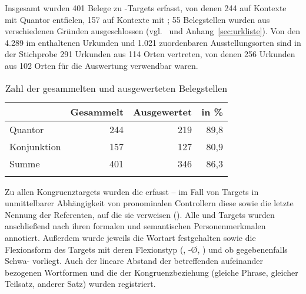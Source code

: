 \label{phsec:caohiatus}

Insgesamt wurden 401 Belege zu -Targets erfasst, von denen 244 auf
Kontexte mit Quantor entfielen, 157 auf Kontexte mit ; 55
Belegstellen wurden aus verschiedenen Gründen ausgeschlossen
(vgl.~ und Anhang~\ref{sec:urkliste}). Von den 4.289 im
\CAO{} enthaltenen Urkunden und 1.021 zuordenbaren Ausstellungsorten sind in
der Stichprobe 291 Urkunden aus 114 Orten vertreten, von denen 256 Urkunden aus
102 Orten für die Auswertung verwendbar waren.

\begin{table}
\centering
\caption{Zahl der gesammelten und ausgewerteten Belegstellen}
\begin{tabular}{l r r r}
\lsptoprule

%
	& Gesammelt
	& Ausgewertet
	& in \%
	\\

\midrule


Quantor
	& 244 %
	& 219 %
	& 89,8 %
	\\

Konjunktion
	& 157 %
	& 127 %
	& 80,9 %
	\\

\midrule

Summe
	& 401 %
	& 346 %
	& 86,3 %
	\\

\lspbottomrule
\end{tabular}
\label{tab:ausgewcao}
\end{table}

Zu allen Kongruenztargets wurden die  erfasst -- im Fall von
Targets in unmittelbarer Abhängigkeit von pronominalen
Controllern diese sowie die letzte Nennung der Referenten, auf
die sie verweisen (). Alle 
und Targets wurden anschließend nach ihren formalen und semantischen
Personenmerkmalen annotiert. Außerdem wurde jeweils die Wortart festgehalten
sowie die Flexionsform des Targets mit deren Flexionstyp (, -Ø,
) und ob gegebenenfalls Schwa- vorliegt. Auch der
lineare Abstand der betreffenden aufeinander bezogenen
Wortformen und die  der Kongruenzbeziehung
(gleiche Phrase, gleicher Teilsatz, anderer Satz) wurden registriert.

